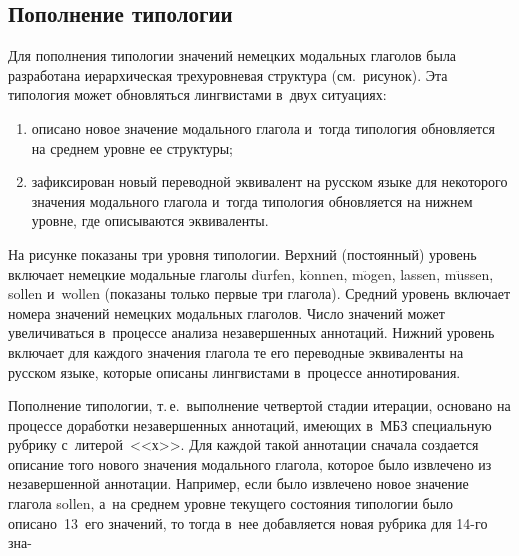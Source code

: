 \begin{multicols}{2}
\section{Пополнение типологии}
    
  Для пополнения типологии значений немецких модальных глаголов была 
разработана иерархическая трехуровневая структура (см.\ рисунок). Эта типология 
может обновляться лингвистами в~двух ситуациях:
  \begin{enumerate}[(1)]
    \item описано новое значение модального глагола и~тогда типология 
обновляется на среднем уровне ее структуры;
    \item зафиксирован новый переводной эквивалент на русском языке для 
некоторого значения модального глагола и~тогда типология об\-нов\-ля\-ет\-ся на 
нижнем уровне, где описываются эквиваленты.
    \end{enumerate}
    
  

  На рисунке показаны три уровня типологии. Верхний (постоянный) уровень 
включает немецкие модальные глаголы d$\ddot{\mbox{u}}$rfen, 
k$\ddot{\mbox{o}}$nnen, m$\ddot{\mbox{o}}$gen, lassen, 
m$\ddot{\mbox{u}}$ssen, sollen и~wollen (показаны только первые три глагола). 
Средний уровень включает номера значений немецких модальных глаголов. Число 
значений может увеличиваться в~процессе анализа незавершенных аннотаций. 
Нижний уровень включает для каждого значения глагола те его переводные 
эквиваленты на русском языке, которые описаны лингвистами в~процессе 
аннотирования.


  
  Пополнение типологии, т.\,е.\ выполнение чет\-вер\-той стадии итерации, 
основано на процессе доработки незавершенных аннотаций, имеющих в~МБЗ 
специальную рубрику с~литерой~<<х>>. Для каж\-дой такой аннотации сначала 
создается описание того нового значения модального глагола, которое было 
извлечено из незавершенной аннотации. Например, если было извлечено новое 
значение глагола sollen, а~на среднем уровне текущего состояния типологии 
было описано~13~его значений, то
тогда в~нее добавляется новая рубрика для 
14-го зна-\linebreak\vspace*{-12pt}

{ \begin{center}  %
 \vspace*{12pt}
   \mbox{%
 \epsfxsize=78.409mm 
 }



\end{center}}
\end{multicols}
